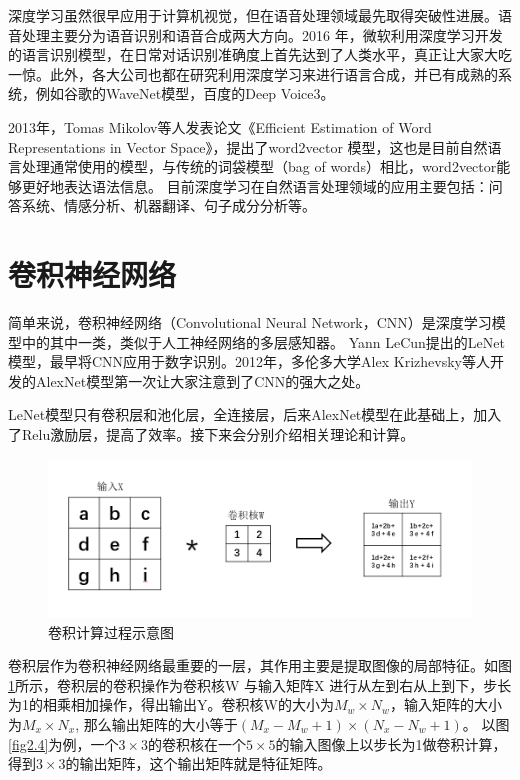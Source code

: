 深度学习虽然很早应用于计算机视觉，但在语音处理领域最先取得突破性进展。语音处理主要分为语音识别和语音合成两大方向。2016 年，微软利用深度学习开发的语言识别模型，在日常对话识别准确度上首先达到了人类水平，真正让大家大吃一惊。此外，各大公司也都在研究利用深度学习来进行语言合成，并已有成熟的系统，例如谷歌的WaveNet模型，百度的Deep Voice3。

2013年，Tomas Mikolov等人发表论文《Efficient Estimation of Word Representations in Vector Space》\cite{2013word2vector}，提出了word2vector 模型，这也是目前自然语言处理通常使用的模型，与传统的词袋模型（bag of words）相比，word2vector能够更好地表达语法信息。
目前深度学习在自然语言处理领域的应用主要包括：问答系统、情感分析、机器翻译、句子成分分析等。
\section{卷积神经网络}

简单来说，卷积神经网络（Convolutional Neural Network，CNN）是深度学习模型中的其中一类，类似于人工神经网络的多层感知器。
Yann LeCun提出的LeNet\cite{1998Gradient}模型，最早将CNN应用于数字识别。2012年，多伦多大学Alex Krizhevsky等人开发的AlexNet\cite{2012AlexNet}模型第一次让大家注意到了CNN的强大之处。

LeNet模型只有卷积层和池化层，全连接层，后来AlexNet模型在此基础上，加入了Relu激励层，提高了效率。接下来会分别介绍相关理论和计算。

\begin{figure}[h]
\begin{center}
\includegraphics[width=1\textwidth]{figures/CNN1.png}
\end{center}
\vspace{-5mm}
\caption{卷积计算过程示意图}
\label{fig2.3}
\end{figure}

卷积层作为卷积神经网络最重要的一层，其作用主要是提取图像的局部特征。如图\ref{fig2.3}所示，卷积层的卷积操作为卷积核W 与输入矩阵X 进行从左到右从上到下，步长为1的相乘相加操作，得出输出Y。卷积核W的大小为$M_w \times N_w$，输入矩阵的大小为$M_x \times N_x$, 那么输出矩阵的大小等于$(M_x-M_w+1)\times(N_x-N_w+1)$。
以图\ref{fig2.4}为例，一个$3\times 3$的卷积核在一个$5\times 5$的输入图像上以步长为1做卷积计算，
得到$3\times 3$的输出矩阵，这个输出矩阵就是特征矩阵。

